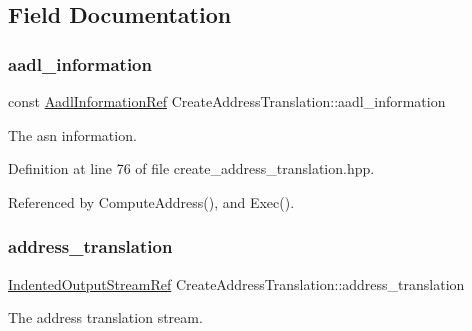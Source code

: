 \subsection{Field Documentation}
\mbox{\label{classCreateAddressTranslation_a0f2fb7ac9be0df4f2d1109d97d1564de}} 
\subsubsection{\texorpdfstring{aadl\+\_\+information}{aadl\_information}}
{\footnotesize\ttfamily const \hyperlink{aadl__information_8hpp_ad2aa3a9df7fbf64760e8fc1a5e7b9b3e}{Aadl\+Information\+Ref} Create\+Address\+Translation\+::aadl\+\_\+information\hspace{0.3cm}{\ttfamily [protected]}}



The asn information. 



Definition at line 76 of file create\+\_\+address\+\_\+translation.\+hpp.



Referenced by Compute\+Address(), and Exec().

\mbox{\label{classCreateAddressTranslation_a891db1631bb7940e6653d2b1b6ecf079}} 
\subsubsection{\texorpdfstring{address\+\_\+translation}{address\_translation}}
{\footnotesize\ttfamily \hyperlink{indented__output__stream_8hpp_ab32278e11151ef292759c88e99b77feb}{Indented\+Output\+Stream\+Ref} Create\+Address\+Translation\+::address\+\_\+translation\hspace{0.3cm}{\ttfamily [protected]}}



The address translation stream. 



